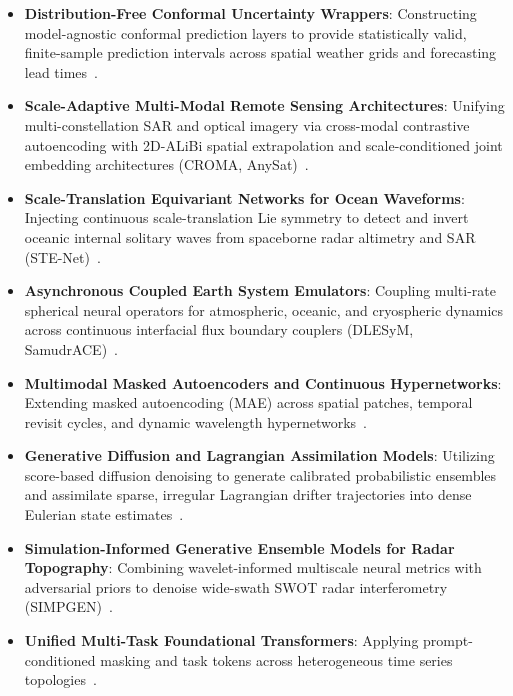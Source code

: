 \begin{itemize}
    \item \textbf{Distribution-Free Conformal Uncertainty Wrappers}: Constructing model-agnostic conformal prediction layers to provide statistically valid, finite-sample prediction intervals across spatial weather grids and forecasting lead times~\cite{gopakumar2024conformal}.
    \item \textbf{Scale-Adaptive Multi-Modal Remote Sensing Architectures}: Unifying multi-constellation SAR and optical imagery via cross-modal contrastive autoencoding with 2D-ALiBi spatial extrapolation and scale-conditioned joint embedding architectures (CROMA, AnySat)~\cite{fuller2023croma,astruc2024anysat}.
    \item \textbf{Scale-Translation Equivariant Networks for Ocean Waveforms}: Injecting continuous scale-translation Lie symmetry to detect and invert oceanic internal solitary waves from spaceborne radar altimetry and SAR (STE-Net)~\cite{wan2024ste}.
    \item \textbf{Asynchronous Coupled Earth System Emulators}: Coupling multi-rate spherical neural operators for atmospheric, oceanic, and cryospheric dynamics across continuous interfacial flux boundary couplers (DLESyM, SamudrACE)~\cite{cresswellclay2024dlesym,duncan2025samudrace}.
    \item \textbf{Multimodal Masked Autoencoders and Continuous Hypernetworks}: Extending masked autoencoding (MAE) across spatial patches, temporal revisit cycles, and dynamic wavelength hypernetworks~\cite{cong2022satmae,tseng2023presto,tseng2025galileo,jakubik2023prithvi,xiong2024dofa,goswami2024moment}.
    \item \textbf{Generative Diffusion and Lagrangian Assimilation Models}: Utilizing score-based diffusion denoising to generate calibrated probabilistic ensembles and assimilate sparse, irregular Lagrangian drifter trajectories into dense Eulerian state estimates~\cite{price2023gencast,li2024seeds,xu2024extremecast,asefi2025lagrangian}.
    \item \textbf{Simulation-Informed Generative Ensemble Models for Radar Topography}: Combining wavelet-informed multiscale neural metrics with adversarial priors to denoise wide-swath SWOT radar interferometry (SIMPGEN)~\cite{cutolo2025swot}.
    \item \textbf{Unified Multi-Task Foundational Transformers}: Applying prompt-conditioned masking and task tokens across heterogeneous time series topologies~\cite{gao2024units,smith2023earthpt}.
\end{itemize}

